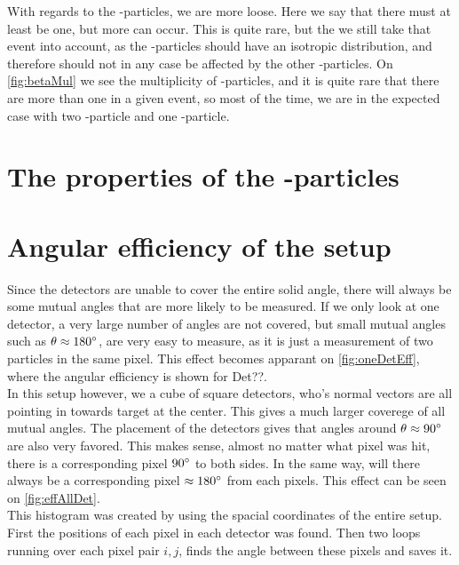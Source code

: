 With regards to the \be-particles, we are more loose. Here we say that there must at least be one, but more can occur. This is quite rare, but the we still take that event into account, as the \be-particles should have an isotropic distribution, and therefore should not in any case be affected by the other \al-particles. On \cref{fig:betaMul} we see the multiplicity of \be-particles, and it is quite rare that there are more than one in a given event, so most of the time, we are in the expected case with two \al-particle and one \be-particle. 


\section{The properties of the \al-particles}


\section{Angular efficiency of the setup}
Since the detectors are unable to cover the entire solid angle, there will always be some mutual angles that are more likely to be measured. 
If we only look at one detector, a very large number of angles are not covered, but small mutual angles such as $\theta \approx 180\degree$, are very easy to measure, as it is just a measurement of two particles in the same pixel. 
This effect becomes apparant on \cref{fig:oneDetEff}, where the angular efficiency is shown for Det??. \\
In this setup however, we a cube of square detectors, who's normal vectors are all pointing in towards target at the center. This gives a much larger coverege of all mutual angles. 
The placement of the detectors gives that angles around $\theta \approx 90 \degree$ are also very favored. This makes sense, almost no matter what pixel was hit, there is a corresponding pixel $90\degree$ to both sides. In the same way, will there always be a corresponding pixel $\approx 180\degree$ from each pixels. This effect can be seen on \cref{fig:effAllDet}. \\
This histogram was created by using the spacial coordinates of the entire setup. First the positions of each pixel in each detector was found. Then two loops running over each pixel pair $i, j$, finds the angle between these pixels and saves it.\\

